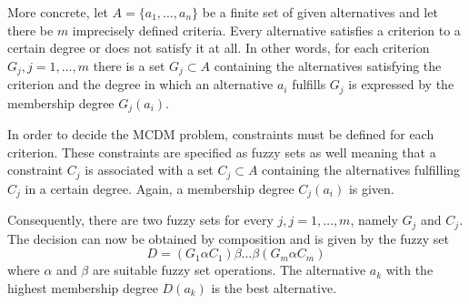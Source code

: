 More concrete, let $A = \{a_1, \ldots, a_n\}$ be a finite set of given alternatives and let there be $m$ imprecisely defined criteria. Every alternative satisfies a criterion to a certain degree or does not satisfy it at all. In other words, for each criterion $G_j, j = 1, \ldots, m$ there is a set $G_j \subset A$ containing the alternatives satisfying the criterion and the degree in which an alternative $a_i$ fulfills $G_j$ is expressed by the membership degree $G_j(a_i)$.

In order to decide the MCDM problem, constraints must be defined for each criterion. These constraints are specified as fuzzy sets as well meaning that a constraint $C_j$ is associated with a set $C_j \subset A$ containing the alternatives fulfilling $C_j$ in a certain degree. Again, a membership degree $C_j(a_i)$ is given.

Consequently, there are two fuzzy sets for every $j, j = 1, \ldots, m$, namely $G_j$ and $C_j$. The decision can now be obtained by composition and is given by the fuzzy set 
\begin{equation}
    D = (G_1 \alpha C_1) \beta \ldots \beta (G_m \alpha C_m)
\end{equation}
where $\alpha$ and $\beta$ are suitable fuzzy set operations. The alternative $a_k$ with the highest membership degree $D(a_k)$ is the best alternative.




